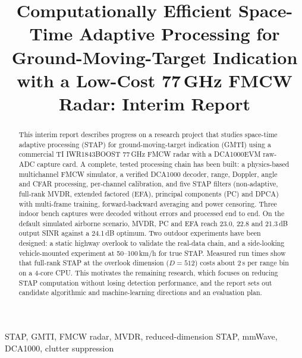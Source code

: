 \documentclass[conference]{IEEEtran}
\begin{document}
\title{Computationally Efficient Space-Time Adaptive Processing for Ground-Moving-Target Indication with a Low-Cost 77\,GHz FMCW Radar: Interim Report}

\author{
}

\maketitle

\begin{abstract}
This interim report describes progress on a research project that studies space-time adaptive
processing (STAP) for ground-moving-target indication (GMTI) using a commercial TI IWR1843BOOST
77\,GHz FMCW radar with a DCA1000EVM raw-ADC capture card. A complete, tested processing chain
has been built: a physics-based multichannel FMCW simulator, a verified DCA1000 decoder, range,
Doppler, angle and CFAR processing, per-channel calibration, and five STAP filters (non-adaptive,
full-rank MVDR, extended factored (EFA), principal components (PC) and DPCA) with multi-frame
training, forward-backward averaging and power censoring. Three indoor bench captures were decoded
without errors and processed end to end. On the default simulated airborne scenario, MVDR, PC and
EFA reach 23.0, 22.8 and 21.3\,dB output SINR against a 24.1\,dB optimum. Two outdoor experiments
have been designed: a static highway overlook to validate the real-data chain, and a side-looking
vehicle-mounted experiment at 50--100\,km/h for true STAP. Measured run times show that full-rank
STAP at the overlook dimension ($D=512$) costs about 2\,s per range bin on a 4-core CPU. This
motivates the remaining research, which focuses on reducing STAP computation without losing
detection performance, and the report sets out candidate algorithmic and machine-learning
directions and an evaluation plan.
\end{abstract}

\begin{IEEEkeywords}
STAP, GMTI, FMCW radar, MVDR, reduced-dimension STAP, mmWave, DCA1000, clutter suppression
\end{IEEEkeywords}

\end{document}

